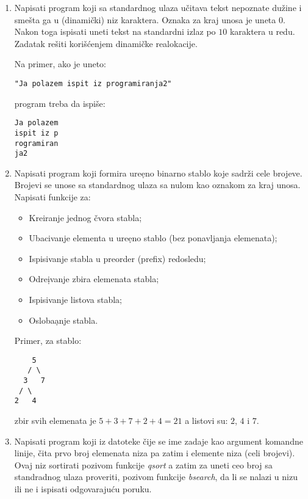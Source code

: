 \begin{enumerate}

\item

Napisati program koji sa standardnog ulaza u\v citava tekst nepoznate
du\v zine i sme\v sta ga u (dinami\v cki) niz karaktera. Oznaka za kraj
unosa je uneta $0$. Nakon toga ispisati uneti tekst na standardni izlaz
po $10$ karaktera u redu. Zadatak re\v siti kori\v s\' cenjem dinami\v cke
realokacije.

Na primer, ako je uneto:

\verb+"Ja polazem ispit iz programiranja2"+

program treba da ispi\v se:

\begin{verbatim}
Ja polazem
ispit iz p
rogramiran
ja2
\end{verbatim}

\item

Napisati program koji formira ure\d eno binarno stablo koje sadr\v zi cele
brojeve. Brojevi se unose sa standardnog ulaza sa nulom kao oznakom za kraj
unosa. Napisati funkcije za:
\begin{itemize}
\item Kreiranje jednog \v cvora stabla;
\item Ubacivanje elementa u ure\d eno stablo (bez ponavljanja elemenata);
\item Ispisivanje stabla u preorder (prefix) redosledu;
\item Odre\d ivanje zbira elemenata stabla;
\item Ispisivanje listova stabla;
\item Osloba\d anje stabla.
\end{itemize}

Primer, za stablo:
\begin{verbatim}
    5
   / \
  3   7
 / \
2   4
\end{verbatim}

zbir svih elemenata je $5+3+7+2+4 = 21$ a listovi su: $2$, $4$ i $7$.

\item

Napisati program koji iz datoteke \v cije se ime zadaje kao argument
komandne linije, \v cita prvo broj elemenata niza pa zatim i elemente niza
(celi brojevi). Ovaj niz sortirati pozivom funkcije \emph{qsort} a zatim za
uneti ceo broj sa standradnog ulaza proveriti, pozivom funkcije
\emph{bsearch}, da li se nalazi u nizu ili ne i ispisati odgovaraju\' cu
poruku.
\end{enumerate}


